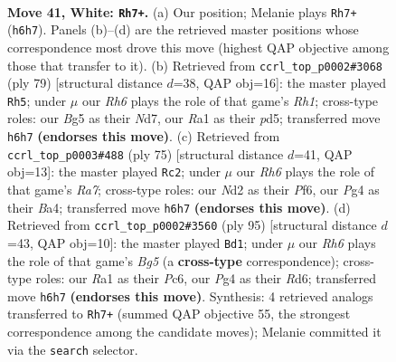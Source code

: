 \documentclass[11pt]{article}
\begin{document}
\clearpage

\begin{figure}[p]\centering
\begin{subfigure}{0.46\textwidth}\centering
\resizebox{\linewidth}{!}{%
\newchessgame
\chessboard[
  setfen={6r1/3b1k2/2n4R/6B1/1p1p2P1/pP6/P1PN3K/R7 w - - 4 41},
  showmover=false,
  pgfstyle=straightmove, color=movearrow, markmove={h6-h7}
]}
\caption{}
\end{subfigure}\hfill
\begin{subfigure}{0.46\textwidth}\centering
\resizebox{\linewidth}{!}{%
\newchessgame
\chessboard[
  setfen={3k3r/p2n4/1p6/2pP1B2/b1P2pNp/P6K/5P2/4R3 b - - 4 40},
  showmover=false,
  pgfstyle=straightmove, color=movearrow, markmove={h8-h5}
]}
\caption{}
\end{subfigure}
\\[4pt]
\begin{subfigure}{0.46\textwidth}\centering
\resizebox{\linewidth}{!}{%
\newchessgame
\chessboard[
  setfen={8/5k1p/5p2/4p3/b3p3/1p2P2P/r4P2/1RB1KN2 b - - 1 38},
  showmover=false,
  pgfstyle=straightmove, color=movearrow, markmove={a2-c2}
]}
\caption{}
\end{subfigure}\hfill
\begin{subfigure}{0.46\textwidth}\centering
\resizebox{\linewidth}{!}{%
\newchessgame
\chessboard[
  setfen={4k3/7R/2pr3p/p1N2p2/4p1b1/PP2P1K1/5P2/8 b - - 1 48},
  showmover=false,
  pgfstyle=straightmove, color=movearrow, markmove={g4-d1}
]}
\caption{}
\end{subfigure}
\caption{\textbf{Move 41, White: \texttt{Rh7+}.} (a) Our position; Melanie plays \texttt{Rh7+} (\texttt{h6h7}). Panels (b)--(d) are the retrieved master positions whose correspondence most drove this move (highest QAP objective among those that transfer to it). (b) Retrieved from \texttt{ccrl\_top\_p0002\#3068} (ply 79) [structural distance $d$=38, QAP obj=16]: the master played \texttt{Rh5}; under $\mu$ our \emph{Rh6} plays the role of that game's \emph{Rh1}; cross-type roles: our \emph{B}g5 as their \emph{N}d7, our \emph{R}a1 as their \emph{p}d5; transferred move \texttt{h6h7} \textbf{(endorses this move)}. (c) Retrieved from \texttt{ccrl\_top\_p0003\#488} (ply 75) [structural distance $d$=41, QAP obj=13]: the master played \texttt{Rc2}; under $\mu$ our \emph{Rh6} plays the role of that game's \emph{Ra7}; cross-type roles: our \emph{N}d2 as their \emph{P}f6, our \emph{P}g4 as their \emph{B}a4; transferred move \texttt{h6h7} \textbf{(endorses this move)}. (d) Retrieved from \texttt{ccrl\_top\_p0002\#3560} (ply 95) [structural distance $d$=43, QAP obj=10]: the master played \texttt{Bd1}; under $\mu$ our \emph{Rh6} plays the role of that game's \emph{Bg5} (a \textbf{cross-type} correspondence); cross-type roles: our \emph{R}a1 as their \emph{P}c6, our \emph{P}g4 as their \emph{R}d6; transferred move \texttt{h6h7} \textbf{(endorses this move)}. Synthesis: 4 retrieved analogs transferred to \texttt{Rh7+} (summed QAP objective 55, the strongest correspondence among the candidate moves); Melanie committed it via the \texttt{search} selector.}
\label{fig:thought-m80}
\end{figure}
\end{document}
